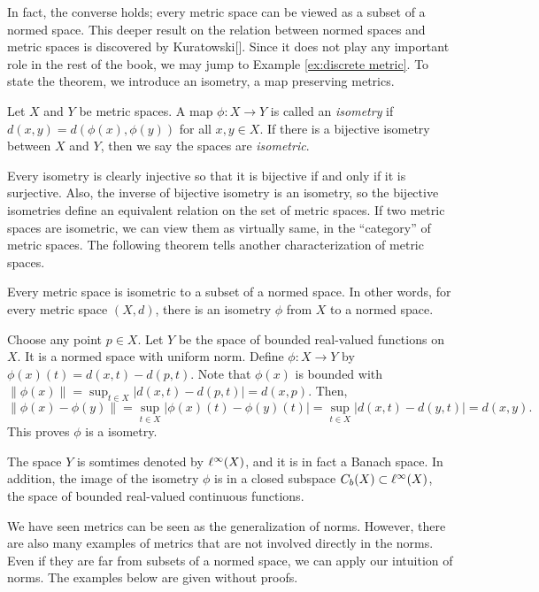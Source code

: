 In fact, the converse holds; every metric space can be viewed as a subset of a normed space.
This deeper result on the relation between normed spaces and metric spaces is discovered by Kuratowski[].
Since it does not play any important role in the rest of the book, we may jump to Example \ref{ex:discrete metric}.
To state the theorem, we introduce an isometry, a map preserving metrics.

\begin{defn}
Let $X$ and $Y$ be metric spaces.
A map $\phi:X\to Y$ is called an \emph{isometry} if $d(x,y)=d(\phi(x),\phi(y))$ for all $x,y\in X$.
If there is a bijective isometry between $X$ and $Y$, then we say the spaces are \emph{isometric}.
\end{defn}

Every isometry is clearly injective so that it is bijective if and only if it is surjective.
Also, the inverse of bijective isometry is an isometry, so the bijective isometries define an equivalent relation on the set of metric spaces.
If two metric spaces are isometric, we can view them as virtually same, in the ``category'' of metric spaces.
The following theorem tells another characterization of metric spaces.

\begin{prop}
Every metric space is isometric to a subset of a normed space.
In other words, for every metric space $(X,d)$, there is an isometry $\phi$ from $X$ to a normed space.
\end{prop}
\begin{pf}
Choose any point $p\in X$.
Let $Y$ be the space of bounded real-valued functions on $X$.
It is a normed space with uniform norm.
Define $\phi:X\to Y$ by $\phi(x)(t)=d(x,t)-d(p,t)$.
Note that $\phi(x)$ is bounded with $\|\phi(x)\|=\sup_{t\in X}|d(x,t)-d(p,t)|=d(x,p)$.
Then,
\[\|\phi(x)-\phi(y)\|=\sup_{t\in X}|\phi(x)(t)-\phi(y)(t)|=\sup_{t\in X}|d(x,t)-d(y,t)|=d(x,y).\]
This proves $\phi$ is a isometry.
\end{pf}
\begin{rmk}
The space $Y$ is somtimes denoted by $\ell^\infty(X)$, and it is in fact a Banach space.
In addition, the image of the isometry $\phi$ is in a closed subspace $C_b(X)\subset\ell^\infty(X)$, the space of bounded real-valued continuous functions.
\end{rmk}

We have seen metrics can be seen as the generalization of norms.
However, there are also many examples of metrics that are not involved directly in the norms.
Even if they are far from subsets of a normed space, we can apply our intuition of norms.
The examples below are given without proofs.

